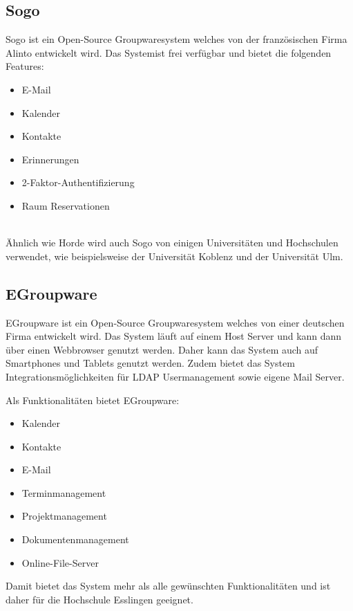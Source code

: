 \subsection{Sogo}

Sogo ist ein Open-Source Groupwaresystem welches von der französischen Firma Alinto entwickelt wird.
Das Systemist frei verfügbar und bietet die folgenden Features:

\begin{itemize}
    \item E-Mail
    \item Kalender
    \item Kontakte
    \item Erinnerungen
    \item 2-Faktor-Authentifizierung
    \item Raum Reservationen
\end{itemize}
\autocite{sogo}
\\
Ähnlich wie Horde wird auch Sogo von einigen Universitäten und Hochschulen verwendet, wie beispielsweise der Universität Koblenz und der Universität Ulm.

\subsection{EGroupware}

EGroupware ist ein Open-Source Groupwaresystem welches von einer deutschen Firma entwickelt wird.
Das System läuft auf einem Host Server und kann dann über einen Webbrowser genutzt werden.
Daher kann das System auch auf Smartphones und Tablets genutzt werden.
Zudem bietet das System Integrationsmöglichkeiten für LDAP Usermanagement sowie eigene Mail Server.

Als Funktionalitäten bietet EGroupware:

\begin{itemize}
    \item Kalender
    \item Kontakte
    \item E-Mail
    \item Terminmanagement
    \item Projektmanagement
    \item Dokumentenmanagement
    \item Online-File-Server
\end{itemize}

Damit bietet das System mehr als alle gewünschten Funktionalitäten und ist daher für die Hochschule Esslingen geeignet.


